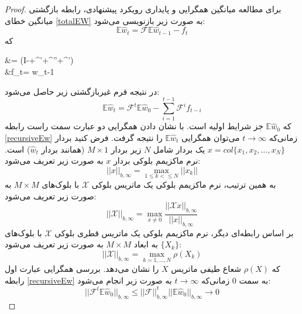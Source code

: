 \begin{proof}\label{ProofTheorem1}
	برای مطالعه میانگین همگرایی و پایداری رویکرد پیشنهادی، رابطه بازگشتی میانگین خطای \ref{totalEW} به صورت زیر بازنویسی می‌شود:
	\begin{equation}\label{e300}
		\mathbb{E}\hat{w}_t=\mathcal{F} \mathbb{E}\hat{w}_{t-1}-{f}_t
	\end{equation}	
	که
	\begin{flalign}\label{e400}
		&= (I-+^{'}+^{''}+^{'})\\		
		&{f}_t= \lambda {}  w_{t-1}
	\end{flalign}
	در نتیجه فرم غیربازگشتی زیر حاصل می‌شود:
	\begin{equation}\label{recursiveEw}
		\mathbb{E}\hat{w}_t=\mathcal{F}^t \mathbb{E}\hat{w}_{0}-\sum_{i=1}^{t-1}{\mathcal{F}^i{f}_{t-i}}
	\end{equation}	
	که $\mathbb{E}\hat{w}_{0}$ جز شرایط اولیه است. با نشان دادن همگرایی دو عبارت سمت راست رابطه \ref{recursiveEw} زمانی‌که $t\rightarrow\infty$ می‌توان همگرایی $\mathbb{E}\hat{w}_t$ را نتیجه گرفت. 
	فرض کنید بردار $x=col\{x_1,x_2,...,x_N\}$ یک بردار شامل $N$ زیر بردار $M\times1$ (همانند بردار $\hat{w}_t$) است. نرم ماکزیمم بلوکی بردار $x$ به صورت زیر تعریف می‌شود: 
	\begin{equation}
		||x||_{b,\infty}=\max_{1\le k<\le N} ‎ ||x_k||
	\end{equation}	
	به همین ترتیب، نرم ماکزیمم بلوکی یک ماتریس بلوکی $\mathcal{X}$ با بلوک‌های $M\times M$ به صورت زیر تعریف می‌شود:
	\begin{equation}
		||\mathcal{X}||_{b,\infty}=\max_{x\ne 0} \frac{||\mathcal{X}x||_{b,\infty}}{||x||_{b,\infty}} ‎ 
	\end{equation}	
	بر اساس رابطه‌ای دیگر، نرم ماکزیمم بلوکی یک ماتریس قطری بلوکی $\mathcal{X}$ با بلوک‌های $\{X_k\}$ به ابعاد $M\times M$ به صورت زیر تعریف می‌شود: 
	\begin{equation}\label{e200}
		||\mathcal{X}||_{b,\infty}=\max_{k=1,...,N}\rho(X_k) ‎ 
	\end{equation}	
	که $\rho(X)$ شعاع طیفی ماتریس $X$ را نشان می‌دهد. بررسی همگرایی عبارت اول رابطه \ref{recursiveEw} به سمت $0$ زمانی‌که $t\rightarrow\infty$ به صورت زیر انجام می‌شود:
	\begin{equation}
		||\mathcal{F}^t\mathbb{E}\hat{w}_0||_{b,\infty}\le ||\mathcal{F}||^t_{b,\infty} ||\mathbb{E}\hat{w}_0||_{b,\infty} \longrightarrow 0
	\end{equation}	

\end{proof}

